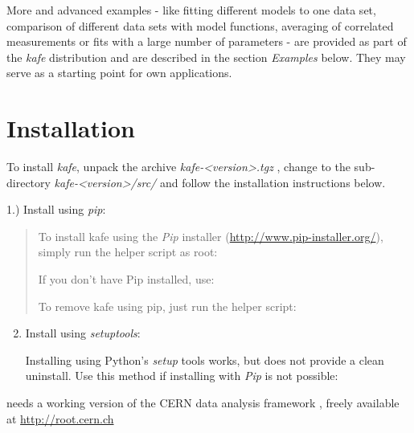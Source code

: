 \documentclass[a4paper,10pt,english]{sphinxmanual}
\begin{document}
More and advanced examples - like fitting different models
to one data set, comparison of different data sets with model
functions, averaging of correlated measurements or fits with
a large number of parameters -
are provided as part of the \emph{kafe} distribution and are
described in the section \emph{Examples} below. They may serve as
a starting point for own applications.


\section{Installation}
\label{index:installation}
To install \emph{kafe}, unpack the archive \emph{kafe-\textless{}version\textgreater{}.tgz} , change to
the sub-directory  \emph{kafe-\textless{}version\textgreater{}/src/}  and follow the installation
instructions below.

1.) Install using \emph{pip}:
\begin{quote}

To install kafe using the \emph{Pip} installer
(\href{http://www.pip-installer.org/}{http://www.pip-installer.org/}), simply
run the helper script as root:
\begin{quote}

\end{quote}

If you don't have Pip installed, use:
\begin{quote}

\end{quote}

To remove kafe using pip, just run the helper script:
\begin{quote}

\end{quote}
\end{quote}
\begin{enumerate}
\setcounter{enumi}{1}
\item {} 
Install using \emph{setuptools}:

Installing using Python's \emph{setup} tools works, but does not
provide a clean uninstall. Use this method if installing
with \emph{Pip} is not possible:
\begin{quote}

\end{quote}

\end{enumerate}

 needs a working version of the CERN data analysis framework ,
freely available at  \href{http://root.cern.ch}{http://root.cern.ch}
\end{document}
